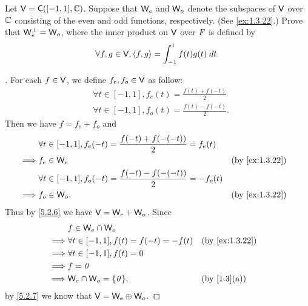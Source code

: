 \begin{ex}\label{ex:6.2.18}
  Let \(\V = \cfs([-1, 1], \C)\).
  Suppose that \(\mathsf{W}_e\) and \(\mathsf{W}_o\) denote the subspaces of \(\mathsf{V}\) over \(\mathbb{C}\) consisting of the even and odd functions, respectively.
  (See \cref{ex:1.3.22}.)
  Prove that \(\mathsf{W}_e^{\perp} = \mathsf{W}_o\), where the inner product on \(\mathsf{V}\) over \(\mathit{F}\) is defined by
  \[
    \forall f, g \in \mathsf{V}, \left\langle f, g\right\rangle = \int_{-1}^1 f(t) g(t) \; dt.
  \]
\end{ex}

\begin{proof}[]
  For each \(f \in \mathsf{V}\), we define \(f_e, f_o \in \mathsf{V}\) as follow:
  \begin{align*}
     & \forall t \in [-1, 1], f_e(t) = \frac{f(t) + f(-t)}{2}  \\
     & \forall t \in [-1, 1], f_o(t) = \frac{f(t) - f(-t)}{2}.
  \end{align*}
  Then we have \(f = f_e + f_o\) and
  \begin{align*}
             & \forall t \in [-1, 1], f_e(-t) = \frac{f(-t) + f(-(-t))}{2} = f_e(t)                                    \\
    \implies & f_e \in \W_e                                                          &  & \text{(by \cref{ex:1.3.22})} \\
             & \forall t \in [-1, 1], f_o(-t) = \frac{f(-t) - f(-(-t))}{2} = -f_o(t)                                   \\
    \implies & f_o \in \W_o.                                                         &  & \text{(by \cref{ex:1.3.22})}
  \end{align*}
  Thus by \cref{5.2.6} we have \(\mathsf{V} = \mathsf{W}_e + \mathsf{W}_o\).
  Since
  \begin{align*}
             & f \in \W_e \cap \W_o                                                          \\
    \implies & \forall t \in [-1, 1], f(t) = f(-t) = -f(t) &  & \text{(by \cref{ex:1.3.22})} \\
    \implies & \forall t \in [-1, 1], f(t) = 0                                               \\
    \implies & f = \zv                                                                       \\
    \implies & \W_e \cap \W_o = \set{\zv},                 &  & \text{(by \cref{1.3}(a))}
  \end{align*}
  by \cref{5.2.7} we know that \(\mathsf{V} = \mathsf{W}_e \oplus \mathsf{W}_o\).


\end{proof}
